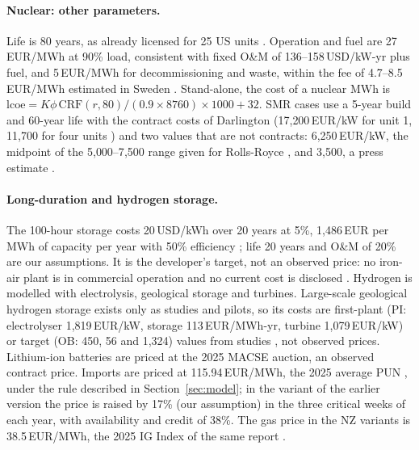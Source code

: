 \paragraph{Nuclear: other parameters.} Life is 80 years, as already licensed for 25 US units \citep{NRCslr}. Operation and fuel are 27\,EUR/MWh at 90\% load, consistent with fixed O\&M of 136--158\,USD/kW-yr \citep{Lazard2025} plus fuel, and 5\,EUR/MWh for decommissioning and waste, within the fee of 4.7--8.5\,EUR/MWh estimated in Sweden \citep{Riksgalden2025}. Stand-alone, the cost of a nuclear MWh is $\mathrm{lcoe}=K\phi\,\mathrm{CRF}(r,80)/(0.9\times8760)\times1000+32$. SMR cases use a 5-year build and 60-year life with the contract costs of Darlington (17{,}200\,EUR/kW for unit 1, 11{,}700 for four units \citep{POWERDarlington2025}) and two values that are not contracts: 6{,}250\,EUR/kW, the midpoint of the 5{,}000--7{,}500 range given for Rolls-Royce \citep{WNNWylfa2025}, and 3{,}500, a press estimate \citep{Sole24SMR}.

\paragraph{Long-duration and hydrogen storage.} The 100-hour storage costs 20\,USD/kWh over 20 years at 5\%, 1{,}486\,EUR per MWh of capacity per year with 50\% efficiency \citep{FormTarget2021,FormRTE2026}; life 20 years and O\&M of 20\% are our assumptions. It is the developer's target, not an observed price: no iron-air plant is in commercial operation and no current cost is disclosed \citep{FormMIT2026}. Hydrogen is modelled with electrolysis, geological storage and turbines. Large-scale geological hydrogen storage exists only as studies and pilots, so its costs are first-plant (PI: electrolyser 1{,}819\,EUR/kW, storage 113\,EUR/MWh-yr, turbine 1{,}079\,EUR/kW) or target (OB: 450, 56 and 1{,}324) values from studies \citep{HystoriesD86,BaringaDESNZ2025,IEAGHR2025}, not observed prices. Lithium-ion batteries are priced at the 2025 MACSE auction, an observed contract price. Imports are priced at 115.94\,EUR/MWh, the 2025 average PUN \citep{GME2025}, under the rule described in Section~\ref{sec:model}; in the variant of the earlier version the price is raised by 17\% (our assumption) in the three critical weeks of each year, with availability and credit of 38\%. The gas price in the NZ variants is 38.5\,EUR/MWh, the 2025 IG Index of the same report \citep{GME2025}.

\begin{table}[htbp]
\centering\footnotesize
\caption{Model inputs and their status. DATA: read in a source; DERIVED: calculation on data; ESTIMATE: author's judgement with a declared method; ASSUMPTION: model choice without a source, tested in a sensitivity.}\label{tab:inputs}

\end{table}

